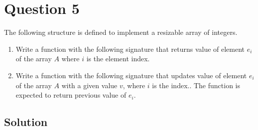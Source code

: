 \documentclass[12pt,letterpaper,twoside]{article}
\begin{document}
\section*{Question 5}

The following structure is defined to implement a resizable array of integers.

\lstset{language=c,tabsize=4}


\begin{enumerate}
\item Write a function with the following signature that returns value of element $e_{i}$ of the array $A$ where $i$ is the element index.



\item Write a function with the following signature that updates value of element $e_{i}$ of the array $A$ with a given value $v$, where $i$ is the index..
The function is expected to return previous value of $e_{i}$.


\end{enumerate}

\subsection*{Solution}



\end{document}
